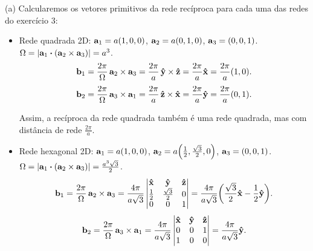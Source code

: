 \documentclass[a4paper,10pt]{article}
\begin{document}
(a) Calcularemos os vetores primitivos da rede recíproca para cada uma das redes do exercício 3:
\begin{itemize}
\item Rede quadrada 2D: $\vb{a}_1 = a(1,0,0)$, $\vb{a}_2 = a(0,1,0)$, $\vb{a}_3 = (0,0,1)$. $\Omega = \abs{\a_1 \vdot (\a_2 \times \a_3)} = a^3$.
$$
\vb{b}_1 = \frac{2\pi}{\Omega} \, \vb{a}_2 \times \vb{a}_3 = \frac{2\pi}{a} \, \vu{y} \times \vu{z} = \frac{2\pi}{a} \vu{x} = \frac{2\pi}{a} (1, 0).
$$
$$
\vb{b}_2 = \frac{2\pi}{\Omega} \, \vb{a}_3 \times \vb{a}_1 = \frac{2\pi}{a} \, \vu{z} \times \vu{x} = \frac{2\pi}{a} \vu{y} = \frac{2\pi}{a} (0, 1).
$$

Assim, a recíproca da rede quadrada também é uma rede quadrada, mas com distância de rede $\frac{2\pi}{a}$.

\item Rede hexagonal 2D: $\vb{a}_1 = a(1,0,0)$, $\vb{a}_2 = a\qty(\frac{1}{2},\frac{\sqrt{3}}{2},0)$, $\vb{a}_3 = (0,0,1)$. $\Omega = \abs{\a_1 \vdot (\a_2 \times \a_3)} = \frac{a^3 \sqrt{3}}{2}$.
$$
\vb{b}_1 = \frac{2\pi}{\Omega} \, \vb{a}_2 \times \vb{a}_3 =
\frac{4\pi}{a \sqrt{3}}
\begin{vmatrix}
\vu{x} & \vu{y} & \vu{z} \\
\frac{1}{2} & \frac{\sqrt{3}}{2} & 0 \\
0 & 0 & 1 \\
\end{vmatrix}
=
\frac{4\pi}{a \sqrt{3}} \qty(\frac{\sqrt{3}}{2} \vu{x} - \frac{1}{2} \vu{y}).
$$
$$
\vb{b}_2 = \frac{2\pi}{\Omega} \, \vb{a}_3 \times \vb{a}_1 =
\frac{4\pi}{a \sqrt{3}}
\begin{vmatrix}
\vu{x} & \vu{y} & \vu{z} \\
0 & 0 & 1 \\
1 & 0 & 0 \\
\end{vmatrix}
= \frac{4\pi}{a\sqrt{3}} \vu{y}.
$$
\end{itemize}
\end{document}
